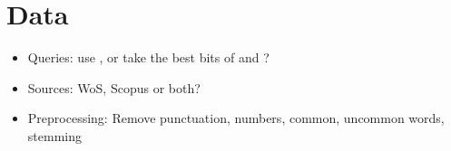 \documentclass{article}
\begin{document}
\section{Data}
\begin{itemize}
	\item Queries: use \citet{Grieneisen2011}, or take the best bits of \citet{Grieneisen2011} and \citet{Haunschild2016}?
    \item Sources: WoS, Scopus or both?
    \item Preprocessing: Remove punctuation, numbers, common, uncommon words, stemming
\end{itemize}





\listoffigures
\linespread{1}


\end{document}
